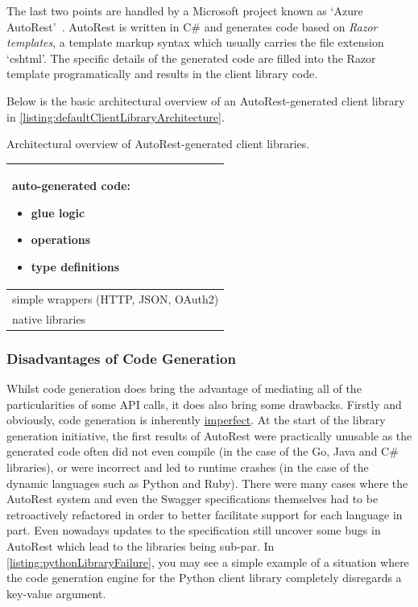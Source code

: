 \documentclass[11pt]{report}
\begin{document}
The last two points are handled by a Microsoft project known
as `Azure AutoRest'~\cite{azureAutoRest}. AutoRest is written in C\# and
generates code based on \textit{Razor templates}, a template markup syntax
which usually carries the file extension `cshtml'. The specific details of the
generated code are filled into the Razor template programatically and results
in the client library code.

Below is the basic architectural overview of an AutoRest-generated client
library in \autoref{listing:defaultClientLibraryArchitecture}.

\begin{listing}[H]
\caption{Architectural overview of AutoRest-generated client libraries.}
\label{listing:defaultClientLibraryArchitecture}
\begin{center}
    \begin{tabular}{ | p{7.5cm} | }
        \hline
        \textbf{auto-generated }code:
        \begin{itemize}
            \item{} glue logic
            \item{} operations
            \item{} type definitions
        \end{itemize} \\
        \hline
        simple wrappers (HTTP, JSON, OAuth2) \\
        \hline
        native libraries \\
        \hline
    \end{tabular}
\end{center}
\end{listing}

\subsubsection{Disadvantages of Code Generation}

Whilst code generation does bring the advantage of mediating all of the
particularities of some API calls, it does also bring some drawbacks. \newline
Firstly and obviously, code generation is inherently \ul{imperfect}. At the
start of the library generation initiative, the first results of AutoRest
were practically unusable as the generated code often did not even compile (in the
case of the Go, Java and C\# libraries), or were incorrect and led to runtime
crashes (in the case of the dynamic languages such as Python and Ruby). There
were many cases where the AutoRest system and even the Swagger specifications
themselves had to be retroactively refactored in order to better facilitate
support for each language in part. Even nowadays updates to the specification
still uncover some bugs in AutoRest which lead to the libraries being sub-par.
In \autoref{listing:pythonLibraryFailure}, you may see a simple example of a
situation where the code generation engine for the Python client library
completely disregards a key-value argument.
\end{document}
